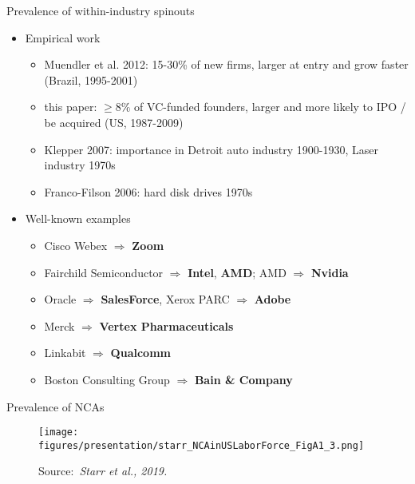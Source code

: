 \documentclass[english,usenames,dvipsnames]{beamer}
\newcommand{\credit}[1]{\par\hfill \tiny Source:~\itshape#1}
\begin{document}
\begin{frame}{Prevalence of within-industry spinouts}
	\label{motivation:importanceOfSpinouts}
	\hyperlink{motivation_1}{}
	\begin{itemize}
		\item Empirical work
		\begin{itemize}
			\item Muendler et al. 2012: 15-30\% of new firms, larger at entry and grow faster (Brazil, 1995-2001)
			\item this paper: $\ge 8\%$ of VC-funded founders, larger and more likely to IPO / be acquired (US, 1987-2009)
			\item Klepper 2007: importance in Detroit auto industry 1900-1930, Laser industry 1970s
			\item Franco-Filson 2006: hard disk drives 1970s
		\end{itemize}
		\smallskip
		\item Well-known examples
		\begin{itemize}
			\item Cisco Webex $\Rightarrow$ \alert{\textbf{Zoom}}
			\item Fairchild Semiconductor $\Rightarrow$ \alert{\textbf{Intel}}, \alert{\textbf{AMD}}; AMD $\Rightarrow$ \alert{\textbf{Nvidia}} \hyperlink{motivation:Fairchildren}{}
			\item Oracle $\Rightarrow$ \alert{\textbf{SalesForce}}, Xerox PARC $\Rightarrow$ \alert{\textbf{Adobe}}
			\item Merck $\Rightarrow$ \alert{\textbf{Vertex Pharmaceuticals}}
			\item Linkabit $\Rightarrow$ \alert{\textbf{Qualcomm}}
			\item Boston Consulting Group $\Rightarrow$ \alert{\textbf{Bain \& Company}}
		\end{itemize}
	\end{itemize}
\end{frame}

\begin{frame}{Prevalence of NCAs}
	\label{motivation:importanceOfNCAs}
	\hyperlink{motivation_1}{}
	\begin{figure}
		\centering
		\texttt{[image: figures/presentation/starr\_NCAinUSLaborForce\_FigA1\_3.png]}
		\credit{Starr et al., 2019.}
	\end{figure}
\end{frame}
\end{document}
